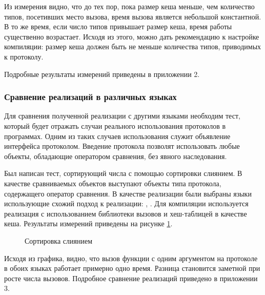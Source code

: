 Из измерения видно, что до тех пор, пока размер кеша меньше, чем количество типов, посетивших место вызова, время вызова является небольшой константной. В то же время, если число типов привышает размер кеша, время работы существенно возрастает. Исходя из этого, можно дать рекомендацию к настройке компиляции: размер кеша должен быть не меньше количества типов, приводимых к протоколу.

Подробные результаты измерений приведены в приложении 2.

\subsubsection{Сравнение реализаций в различных языках}
Для сравнения полученной реализации с другими языками необходим тест, который будет отражать случаи реального использования протоколов в программах. Одним из таких случаев использования служит объявление интерфейса  протоколом. Введение протокола  позволят использовать любые объекты, обладающие оператором сравнения, без явного наследования.

Был написан тест, сортирующий числа с помощью сортировки слиянием\cite{9780262033848}. В качестве сравниваемых объектов выступают объекты типа протокола, содержащего оператор сравнения. В качестве реализации были выбраны  языки использующие схожий подход к реализации: , . Для компиляции  используется реализация с использованием библиотеки вызовов и хеш-таблицей в качестве кеша. Результаты измерений приведены на рисунке \ref{plot:bench:mergeSort}.

\begin{figure}[H]
\caption{\label{plot:bench:mergeSort} Сортировка слиянием}
\end{figure}

Исходя из графика, видно, что вызов функции с одним аргументом на протоколе в обоих языках работает примерно одно время. Разница становится заметной при росте числа вызовов. Подробное сравнение реализаций приведено в приложении 3.
